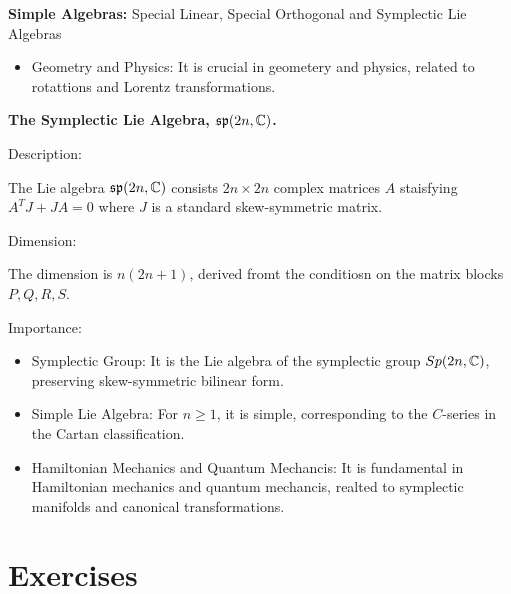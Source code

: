\documentclass[12pt,a4paper]{report}
\begin{document}
\begin{remark}{\textbf{Simple Algebras:} Special Linear, Special Orthogonal and Symplectic Lie Algebras}
\begin{description}
\begin{itemize}
		\item Geometry and Physics:  It is crucial in geometery and physics, related to rotattions and Lorentz transformations.
	\end{itemize}
	
	\item \textbf{The Symplectic Lie Algebra, $\mathfrak{sp}(2n,\mathbb{C})$.}
	
	Description:
	
	The Lie algebra $\mathfrak{sp}(2n,\mathbb{C})$ consists $2n\times 2n$ complex matrices $A$ staisfying $A^TJ+JA = 0$ where $J$ is a standard skew-symmetric matrix.
	
	Dimension:
	
	The dimension is $n(2n+1)$, derived fromt the conditiosn on the matrix blocks $P,Q,R,S$.
	
	Importance:
	\begin{itemize}
		\item Symplectic Group:  It is the Lie algebra of the symplectic group $Sp(2n,\mathbb{C})$, preserving skew-symmetric bilinear form.
		\item Simple Lie Algebra: For $n\ge 1$, it is simple, corresponding to the $C$-series in the Cartan classification.
		
		\item Hamiltonian Mechanics and Quantum Mechancis:  It is fundamental in Hamiltonian mechanics and quantum mechancis, realted to symplectic manifolds and canonical transformations.
	\end{itemize}
\end{description}
\end{remark}
\section{Exercises}
\end{document}

